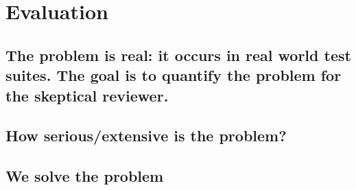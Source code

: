 \section{Evaluation}
\label{sec:eval}

\subsection{The problem is real: it occurs in real world test suites. The goal
is to quantify the problem for the skeptical reviewer.}

\subsection{How serious/extensive is the problem?}

\subsection{We solve the problem}
